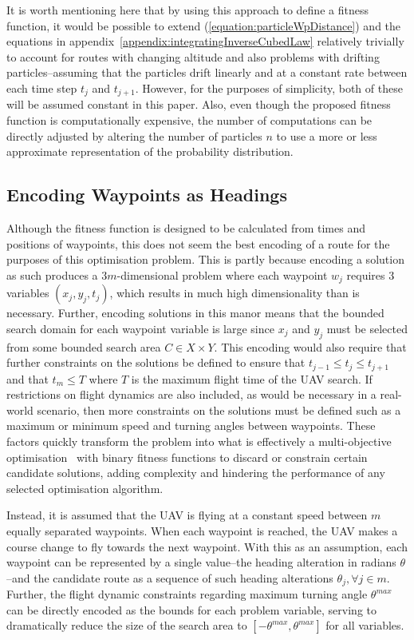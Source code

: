 \documentclass[10pt,a4paper, oneside, conference]{IEEEtran}
\begin{document}
	It is worth mentioning here that by using this approach to define a fitness function, it would be possible to extend (\ref{equation:particleWpDistance}) and the equations in appendix~\ref{appendix:integratingInverseCubedLaw} relatively trivially to account for routes with changing altitude and also problems with drifting particles--assuming that the particles drift linearly and at a constant rate between each time step $t_j$ and $t_{j+1}$. 
	However, for the purposes of simplicity, both of these will be assumed constant in this paper.
	Also, even though the proposed fitness function is computationally expensive, the number of computations can be directly adjusted by altering the number of particles $n$ to use a more or less approximate representation of the probability distribution.
	
	\subsection{Encoding Waypoints as Headings}
	
	Although the fitness function is designed to be calculated from times and positions of waypoints, this does not seem the best encoding of a route for the purposes of this optimisation problem.
	This is partly because encoding a solution as such produces a $3m$-dimensional problem where each waypoint $w_j$ requires 3 variables $(x_j,y_j,t_j)$, which results in much high dimensionality than is necessary.
	Further, encoding solutions in this manor means that the bounded search domain for each waypoint variable is large since $x_j$ and $y_j$ must be selected from some bounded search area $C\in X\times Y$.
	This encoding would also require that further constraints on the solutions be defined to ensure that $t_{j-1}\leq t_j \leq t_{j+1}$ and that $t_m \leq T$ where $T$ is the maximum flight time of the UAV search.
	If restrictions on flight dynamics are also included, as would be necessary in a real-world scenario, then more constraints on the solutions must be defined such as a maximum or minimum speed and turning angles between waypoints.
	These factors quickly transform the problem into what is effectively a multi-objective optimisation~\cite{Yang2015} with binary fitness functions to discard or constrain certain candidate solutions, adding complexity and hindering the performance of any selected optimisation algorithm.
	
	Instead, it is assumed that the UAV is flying at a constant speed between $m$ equally separated waypoints.
	When each waypoint is reached, the UAV makes a course change to fly towards the next waypoint.
	With this as an assumption, each waypoint can be represented by a single value--the heading alteration in radians $\theta$--and the candidate route as a sequence of such heading alterations $\theta_j, \forall j \in m$.
	Further, the flight dynamic constraints regarding maximum turning angle $\theta^{max}$ can be directly encoded as the bounds for each problem variable, serving to dramatically reduce the size of the search area to $[-\theta^{max},\theta^{max}]$ for all variables.
	
\end{document}
